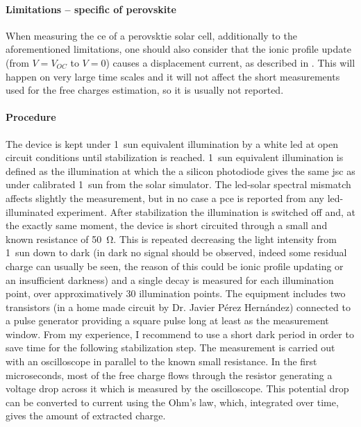 	\paragraph{Limitations -- specific of perovskite} When measuring the \gls{ce} of a perovsktie solar cell, additionally to the aforementioned limitations, one should also consider that the ionic profile update (from $V=V_{OC}$ to $V=0$) causes a displacement current, as described in . This will happen on very large time scales and it will not affect the short measurements used for the free charges estimation, so it is usually not reported\cite{ORegan2015b}.
	
	\paragraph{Procedure} The device is kept under 1~sun equivalent illumination by a white \gls{led} at open circuit conditions until stabilization is reached. 1~sun equivalent illumination is defined as the illumination at which the a silicon photodiode gives the same \gls{jsc} as under calibrated 1~sun from the solar simulator. The \gls{led}-solar spectral mismatch affects slightly the measurement, but in no case a \gls{pce} is reported from any \gls{led}-illuminated experiment. After stabilization the illumination is switched off and, at the exactly same moment, the device is short circuited through a small and known resistance of \SI{50}{\ohm}.
	This is repeated decreasing the light intensity from 1~sun down to dark (in dark no signal should be observed, indeed some residual charge can usually be seen, the reason of this could be ionic profile updating or an insufficient darkness) and a single decay is measured for each illumination point, over approximatively 30 illumination points.
	The equipment includes two transistors (in a home made circuit by Dr. Javier Pérez Hernández) connected to a pulse generator providing a square pulse long at least as the measurement window. From my experience, I recommend to use a short dark period in order to save time for the following stabilization step.
	The measurement is carried out with an oscilloscope in parallel to the known small resistance. In the first microseconds, most of the free charge flows through the resistor generating a voltage drop across it which is measured by the oscilloscope. This potential drop can be converted to current using the Ohm's law, which, integrated over time, gives the amount of extracted charge.

